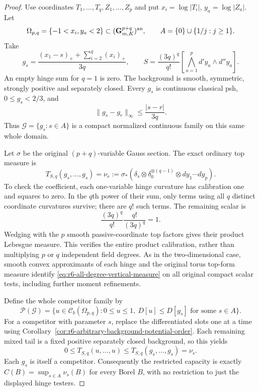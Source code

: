 \documentclass[11pt,a4paper]{article}
\numberwithin{equation}{section}
\theoremstyle{definition}
\theoremstyle{remark}
\begin{document}
\begin{proof}
Use coordinates $T_1,\ldots,T_q,Z_1,\ldots,Z_p$ and put
$x_i=\log|T_i|$, $y_a=\log|Z_a|$. Let
\[
 \Omega_{p,q}=\{-1<x_i,y_a<2\}\subset
                  (\mathbf G_{m,K}^{p+q})^{\rm an},
 \qquad A=\{0\}\cup\{1/j:j\ge1\}.
\]
Take
\[
 g_s=\frac{(x_1-s)_++\sum_{i=2}^{q}(x_i)_+}{3q},
 \qquad
 S=\frac{(3q)^q}{q!}
              \left[\bigwedge_{a=1}^{p}d'y_a\wedge d''y_a\right].
\]
An empty hinge sum for $q=1$ is zero. The background is smooth,
symmetric, strongly positive and separately closed. Every $g_s$
is continuous classical psh, $0\le g_s<2/3$, and
\[
                  \|g_s-g_r\|_\infty\le\frac{|s-r|}{3q}.
\]
Thus $\mathscr G=\{g_s:s\in A\}$ is a compact normalized
continuous family on this same whole domain.

Let $\sigma$ be the original $(p+q)$-variable Gauss section. The
exact ordinary top measure is
\begin{equation}
 T_{S,q}(g_s,\ldots,g_s)
       =\nu_s:=\sigma_*
           (\delta_s\otimes\delta_0^{\otimes(q-1)}
                                      \otimes dy_1\cdots dy_p).
 \label{eq:r6-all-degree-vertical-measure}
\end{equation}
To check the coefficient, each one-variable hinge curvature has
calibration one and squares to zero. In the $q$th power of their
sum, only terms using all $q$ distinct coordinate curvatures survive;
there are $q!$ such terms. The remaining scalar is
\[
                         \frac{(3q)^q}{q!}
                              \frac{q!}{(3q)^q}=1.
\]
Wedging with the $p$ smooth passive-coordinate top factors gives
their product Lebesgue measure. This verifies the entire product
calibration, rather than multiplying $p$ or $q$ independent field
degrees. As in the two-dimensional case, smooth convex approximants
of each hinge and the original torus top-form measure identify
\eqref{eq:r6-all-degree-vertical-measure} on all original compact
scalar tests, including further moment refinements.

Define the whole competitor family by
\[
 \mathscr P(\mathscr G)=\{u\in\mathcal C_b(\Omega_{p,q}):
       0\le u\le1,\ D[u]\le D[g_s]\text{ for some }s\in A\}.
\]
For a competitor with parameter $s$, replace the differentiated
slots one at a time using
Corollary~\ref{cor:r6-arbitrary-background-potential-order}.
Each remaining mixed tail is a fixed positive separately closed
background, so this yields
\[
       0\le T_{S,q}(u,\ldots,u)
                          \le T_{S,q}(g_s,\ldots,g_s)=\nu_s.
\]
Each $g_s$ is itself a competitor. Consequently the restricted
capacity is exactly $C(B)=\sup_{s\in A}\nu_s(B)$ for every
Borel $B$, with no restriction to just the displayed hinge testers.


\end{proof}
\end{document}
